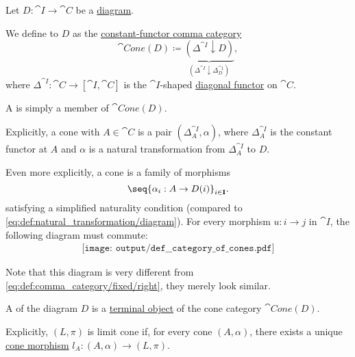 \begin{definition}\label{def:category_of_cones}
  Let \( D: \cat{I} \to \cat{C} \) be a \hyperref[def:categorical_diagram]{diagram}.

  \begin{thmenum}
     We define  to \( D \) as the \hyperref[def:comma_category/fixed]{constant-functor comma category}
    \begin{equation*}
      \cat{Cone}(D) \coloneqq \underbrace{ (\Delta^{\cat{I}} \downarrow D) }_{(\Delta^{\cat{I}} \downarrow \Delta^{\cat{1}}_{D})},
    \end{equation*}
    where \( \Delta^{\cat{I}}: \cat{C} \to [\cat{I}, \cat{C}] \) is the \( \cat{I} \)-shaped \hyperref[def:diagonal_functor]{diagonal functor} on \( \cat{C} \).

     A  is simply a member of \( \cat{Cone}(D) \).

    Explicitly, a cone with  \( A \in \cat{C} \) is a pair \( (\Delta^{\cat{I}}_A, \alpha) \), where \( \Delta^{\cat{I}}_A \) is the constant functor at \( A \) and \( \alpha \) is a natural transformation from \( \Delta^{\cat{I}}_A \) to \( D \).

    Even more explicitly, a cone is a family of morphisms
    \begin{equation}\label{eq:def:category_of_cones/cone}
      \seq{ \alpha_i: A \to D(i) }_{i \in \cat{I}}.
    \end{equation}
    satisfying a simplified naturality condition (compared to \eqref{eq:def:natural_transformation/diagram}). For every morphism \( u: i \to j \) in \( \cat{I} \), the following diagram must commute:
    \begin{equation}\label{eq:def:category_of_cones/cone_nat}
      \begin{aligned}
        \texttt{[image: output/def\_\_category\_of\_cones.pdf]}
      \end{aligned}
    \end{equation}

    Note that this diagram is very different from \eqref{eq:def:comma_category/fixed/right}, they merely look similar.

     A  of the diagram \( D \) is a \hyperref[def:universal_objects/terminal]{terminal object} of the cone category \( \cat{Cone}(D) \).

    Explicitly, \( (L, \pi) \) is limit cone if, for every cone \( (A, \alpha) \), there exists a unique \hyperref[eq:def:comma_category/fixed]{cone morphism} \( l_A: (A, \alpha) \to (L, \pi) \).


\end{thmenum}
\end{definition}
